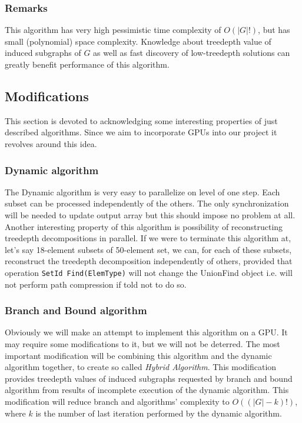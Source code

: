 \subsubsection{Remarks}
This algorithm has very high pessimistic time complexity of $O\left(\left|G\right|!\right)$, but has small (polynomial) space complexity. Knowledge about treedepth value of induced subgraphs of $G$ as well as fast discovery of low-treedepth solutions can greatly benefit performance of this algorithm.
\subsection{Modifications}
This section is devoted to acknowledging some interesting properties of just described algorithms. Since we aim to incorporate GPUs into our project it revolves around this idea.
\subsubsection{Dynamic algorithm}
The Dynamic algorithm is very easy to parallelize on level of one step. Each subset can be processed independently of the others. The only synchronization will be needed to update output array but this should impose no problem at all. Another interesting property of this algorithm is possibility of reconstructing treedepth decompositions in parallel. If we were to terminate this algorithm at, let's say 18-element subsets of 50-element set, we can, for each of these subsets, reconstruct the treedepth decomposition independently of others, provided that operation \texttt{SetId Find(ElemType)} will not change the UnionFind object i.e. will not perform path compression if told not to do so.
\subsubsection{Branch and Bound algorithm}
Obviously we will make an attempt to implement this algorithm on a GPU. It may require some modifications to it, but we will not be deterred. The most important modification will be combining this algorithm and the dynamic algorithm together, to create so called \emph{Hybrid Algorithm}. This modification provides treedepth values of induced subgraphs requested by branch and bound algorithm from results of incomplete execution of the dynamic algorithm. This modification will reduce branch and algorithms' complexity to $O\left(\left(\left|G\right|-k\right)!\right)$, where $k$ is the number of last iteration performed by the dynamic algorithm.
